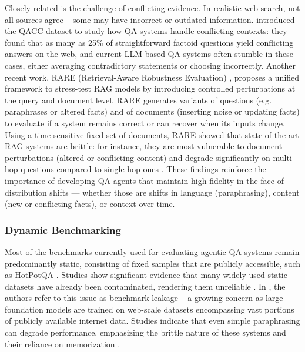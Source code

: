 Closely related is the challenge of conflicting evidence. In realistic web search, not all sources agree – some may have incorrect or outdated information. \cite{liuOpenDomainQuestion2025} introduced the QACC dataset to study how QA systems handle conflicting contexts: they found that as many as 25\% of straightforward factoid questions yield conflicting answers on the web, and current LLM-based QA systems often stumble in these cases, either averaging contradictory statements or choosing incorrectly. Another recent work, RARE (Retrieval-Aware Robustness Evaluation) \cite{zengRARERetrievalAwareRobustness2025}, proposes a unified framework to stress-test RAG models by introducing controlled perturbations at the query and document level. RARE generates variants of questions (e.g. paraphrases or altered facts) and of documents (inserting noise or updating facts) to evaluate if a system remains correct or can recover when its inputs change. Using a time-sensitive fixed set of documents, RARE showed that state-of-the-art RAG systems are brittle: for instance, they are most vulnerable to document perturbations (altered or conflicting content) and degrade significantly on multi-hop questions compared to single-hop ones \cite{zengRARERetrievalAwareRobustness2025}. These findings reinforce the importance of developing QA agents that maintain high fidelity in the face of distribution shifts — whether those are shifts in language (paraphrasing), content (new or conflicting facts), or context over time.

\subsubsection{Dynamic Benchmarking}

Most of the benchmarks currently used for evaluating agentic QA systems remain predominantly static, consisting of fixed samples that are publicly accessible, such as HotPotQA \cite{yangHotpotQADatasetDiverse2018a}. Studies show significant evidence that many widely used static datasets have already been contaminated, rendering them unreliable \cite{zhouDontMakeYour2023,zhuDyValDynamicEvaluation2024b}. In \cite{zhouDontMakeYour2023}, the authors refer to this issue as benchmark leakage -- a growing concern as large foundation models are trained on web-scale datasets encompassing vast portions of publicly available internet data. Studies indicate that even simple paraphrasing can degrade performance, emphasizing the brittle nature of these systems and their reliance on memorization \cite{zhuDyValDynamicEvaluation2024b}.

